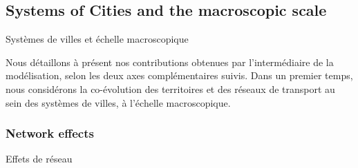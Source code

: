 




\subsection{Systems of Cities and the macroscopic scale}{Systèmes de villes et échelle macroscopique}


Nous détaillons à présent nos contributions obtenues par l'intermédiaire de la modélisation, selon les deux axes complémentaires suivis. Dans un premier temps, nous considérons la co-évolution des territoires et des réseaux de transport au sein des systèmes de villes, à l'échelle macroscopique.


\subsubsection{Network effects}{Effets de réseau}

